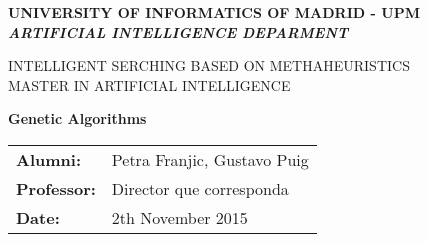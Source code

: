 %
%

%

\graphicspath{ {Graphics/} }

\begin{titlepage}

	\begin{center}

		\vspace{2cm}

		{\Large{\textbf{UNIVERSITY OF INFORMATICS OF MADRID - UPM}}}
		\\
		{\it \large{\textbf{ARTIFICIAL INTELLIGENCE DEPARMENT}}}
		\vspace{1cm}

		{\large INTELLIGENT SERCHING BASED ON METHAHEURISTICS\\MASTER IN ARTIFICIAL INTELLIGENCE}
		\vspace{1cm}

		\textbf{\Large Genetic Algorithms}
		\vspace{7cm}
	\end{center}

	\begin{flushright}
		\begin{tabular}{ll}
			\large{\textbf{Alumni:}}	&
			\large{Petra Franjic, Gustavo Puig} \\

			\large{\textbf{Professor:}}	&
			\large{Director que corresponda} \\

			\large{\textbf{Date:}}	&
			\large{2th November 2015} \\
		\end{tabular}
	\end{flushright}

\end{titlepage}
